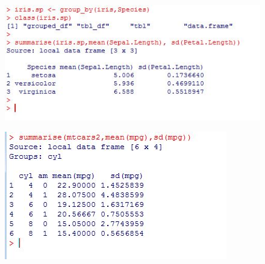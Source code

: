\documentclass{beamer}
\begin{document}
	\begin{frame}
		\begin{figure}
			\centering
			\includegraphics[width=1.05\linewidth]{images/irisgroupby}
		\end{figure}
	\end{frame}	
	
	\begin{frame}
		\begin{figure}
			\centering
			\includegraphics[width=1.1\linewidth]{images/mtcarssummarise}
			\label{fig:mtcarssummarise}
		\end{figure}
	\end{frame}
	
\end{document}
